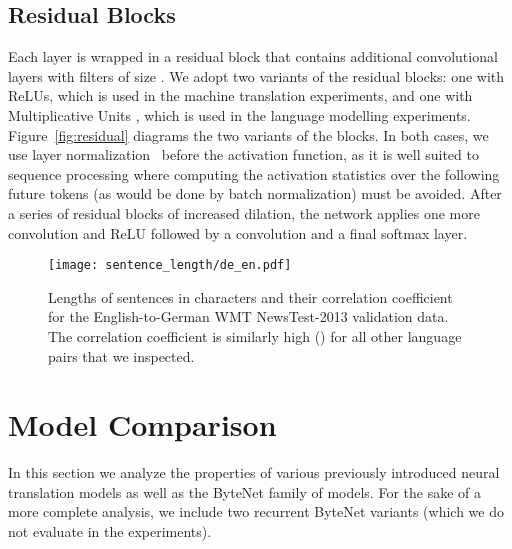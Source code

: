 \documentclass{article}
\begin{document}
\subsection{Residual Blocks}

Each layer is wrapped in a residual block that contains additional convolutional layers with filters of size  \citep{DBLP:journals/corr/HeZR016}. We adopt two variants of the residual blocks: one with ReLUs, which is used in the machine translation experiments, and one with Multiplicative Units \citep{vpn}, which is used in the language modelling experiments. Figure~\ref{fig:residual} diagrams the two variants of the blocks. In both cases, we use layer normalization~\citep{DBLP:journals/corr/BaKH16} before the activation function, as it is well suited to sequence processing where computing the activation statistics over the following future tokens (as would be done by batch normalization) must be avoided.
After a series of residual blocks of increased dilation, the network applies one more convolution  and ReLU followed by a convolution and a final softmax layer.



\begin{figure}[t]
    \centering
    \texttt{[image: sentence\_length/de\_en.pdf]}
    \caption{Lengths of sentences in characters and their correlation coefficient for the English-to-German WMT NewsTest-2013 validation data. The correlation coefficient is similarly high () for all other language pairs that we inspected.}
\label{fig:corr}
\end{figure}



\section{Model Comparison}
\label{modelcomp}

In this section we analyze the properties of various previously introduced neural translation models as well as the ByteNet family of models. For the sake of a more complete analysis, we include two recurrent ByteNet variants (which we do not evaluate in the experiments).
\end{document}
